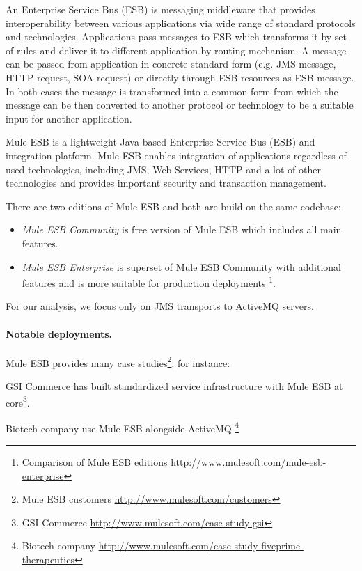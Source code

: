 \documentclass[a4paper]{report}
\begin{document}
An Enterprise Service Bus (ESB) is messaging middleware that provides interoperability between various applications via wide range of standard protocols and technologies. Applications pass messages to ESB which transforms it by set of rules and deliver it to different application by routing mechanism. A message can be passed from application in concrete standard form (e.g. JMS message, HTTP request, SOA request) or directly through ESB resources as ESB message. In both cases the message is transformed into a common form from which the message can be then converted to another protocol or technology to be a suitable input for another application. 

Mule ESB is a lightweight Java-based Enterprise Service Bus (ESB) and integration platform. Mule ESB enables integration of applications regardless of used technologies, including JMS, Web Services, HTTP and a lot of other technologies and provides important security and transaction management.

There are two editions of Mule ESB and both are build on the same codebase:
\begin{itemize}
\item \emph{Mule ESB Community} is free version of Mule ESB which includes all main features.
\item \emph{Mule ESB Enterprise} is superset of Mule ESB Community with additional features and is more suitable for production deployments \footnote{Comparison of Mule ESB editions \url{http://www.mulesoft.com/mule-esb-enterprise}}.
\end{itemize}

For our analysis, we focus only on JMS transports to ActiveMQ servers.

\paragraph{Notable deployments.}
Mule ESB provides many case studies\footnote{Mule ESB customers \url{http://www.mulesoft.com/customers}}, for instance:
\begin{compactitem}
\item GSI Commerce has built standardized service infrastructure with Mule ESB at core\footnote{GSI Commerce \url{http://www.mulesoft.com/case-study-gsi}}.
\item Biotech company use Mule ESB alongside ActiveMQ \footnote{Biotech company \url{http://www.mulesoft.com/case-study-fiveprime-therapeutics}}
\end{compactitem}
\end{document}
